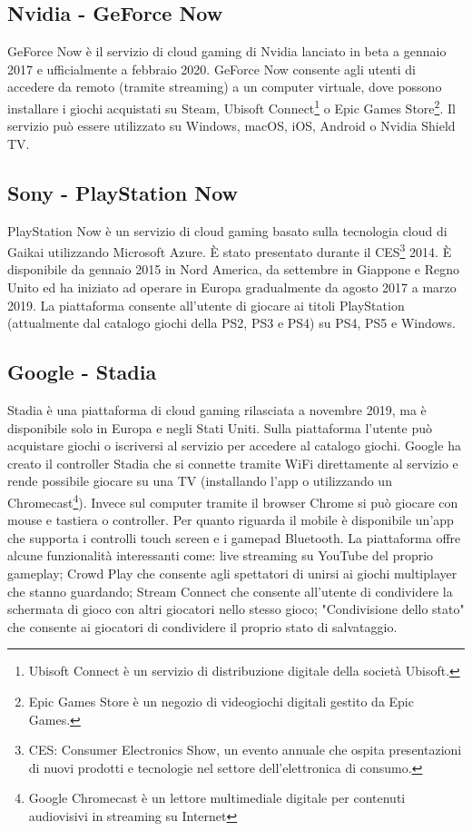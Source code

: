 \subsection{Nvidia - GeForce Now}
GeForce Now è il servizio di cloud gaming di Nvidia lanciato in beta a gennaio 2017 e ufficialmente a febbraio 2020. GeForce Now consente agli utenti di accedere da remoto (tramite streaming) a un computer virtuale, dove possono installare i giochi acquistati su Steam, Ubisoft Connect\footnote{Ubisoft Connect è un servizio di distribuzione digitale della società Ubisoft.} o Epic Games Store\footnote{Epic Games Store è un negozio di videogiochi digitali gestito da Epic Games.}. Il servizio può essere utilizzato su Windows, macOS, iOS, Android o Nvidia Shield TV\cite{GeForce_Now}.

\subsection{Sony - PlayStation Now}
PlayStation Now è un servizio di cloud gaming basato sulla tecnologia cloud di Gaikai utilizzando Microsoft Azure. È stato presentato durante il CES\footnote{CES: Consumer Electronics Show, un evento annuale che ospita presentazioni di nuovi prodotti e tecnologie nel settore dell'elettronica di consumo.} 2014. È disponibile da gennaio 2015 in Nord America, da settembre in Giappone e Regno Unito ed ha iniziato ad operare in Europa gradualmente da agosto 2017 a marzo 2019. La piattaforma consente all'utente di giocare ai titoli PlayStation (attualmente dal catalogo giochi della PS2, PS3 e PS4) su PS4, PS5 e Windows\cite{PlayStation_Now}.

\subsection{Google - Stadia}
Stadia è una piattaforma di cloud gaming rilasciata a novembre 2019, ma è disponibile solo in Europa e negli Stati Uniti. Sulla piattaforma l'utente può acquistare giochi o iscriversi al servizio per accedere al catalogo giochi. Google ha creato il controller Stadia che si connette tramite WiFi direttamente al servizio e rende possibile giocare su una TV (installando l'app o utilizzando un Chromecast\footnote{Google Chromecast è un lettore multimediale digitale per contenuti audiovisivi in streaming su Internet}). Invece sul computer tramite il browser Chrome si può giocare con mouse e tastiera o controller. Per quanto riguarda il mobile è disponibile un'app che supporta i controlli touch screen e i gamepad Bluetooth. La piattaforma offre alcune funzionalità interessanti come: live streaming su YouTube del proprio gameplay; Crowd Play che consente agli spettatori di unirsi ai giochi multiplayer che stanno guardando; Stream Connect che consente all'utente di condividere la schermata di gioco con altri giocatori nello stesso gioco; "Condivisione dello stato" che consente ai giocatori di condividere il proprio stato di salvataggio\cite{Google_Stadia}.

